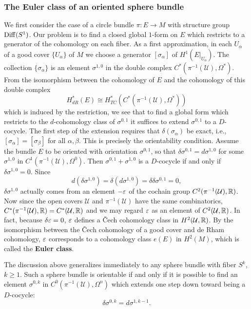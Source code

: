 \subsubsection{The Euler class of an oriented sphere bundle}
We first consider the case of a circle bundle $\pi:E\to M$ with structure group $\mathrm{Diff}(S^1)$. Our problem is to find a closed global $1$-form on $E$ which restricts to 
a generator of the cohomology on each fiber. As a first approximation, in each $U_\alpha$ of a good cover $\{U_\alpha\}$ of $M$ we choose a generator $[\sigma_\alpha]$ 
of $H^1(E|_{U_\alpha})$. The collection $\{\sigma_\alpha\}$ is an element $\sigma^{1,0}$ in the double complex $C^*(\pi^{-1}(\mathcal{U}),\Omega^*)$. From the 
isomorphism between the cohomology of $E$ and the cohomology of this double complex
\[H^*_{dR}(E)\cong H_{TC}^*(C^*(\pi^{-1}(\mathcal{U}),\Omega^*))\]
which is induced by the restriction, we see that to find a global form which restricts to the $d$-cohomology class of $\sigma^{0,1}$ it suffices to extend 
$\sigma^{0,1}$ to a $D$-cocycle. The first step of the extension requires that $\delta(\sigma_\alpha)$ be exact, i.e., $[\sigma_\alpha]=[\sigma_\beta]$ for all 
$\alpha,\beta$. This is precisely the orientability condition. Assume the bundle $E$ to be oriented with orientation $\sigma^{0,1}$, so that $\delta\sigma^{0,1}=d\sigma^{1,0}$ 
for some $\sigma^{1,0}$ in $C^1(\pi^{-1}(\mathcal{U}),\Omega^0)$. Then $\sigma^{0,1}+\sigma^{1,0}$ is a $D$-cocycle if and only if $\delta\sigma^{1,0}=0$. Since
\[d(\delta\sigma^{1,0})=\delta(d\sigma^{1,0})=\delta\delta\sigma^{0,1}=0,\]
$\delta\sigma^{1,0}$ actually comes from an element $-\varepsilon$ of the cochain group $C^2(\pi^{-1}(\mathcal{U}),\mathbb{R})$. Now since the open covers $\mathcal{U}$ and $\pi^{-1}(\mathcal{U})$ 
have the same combinatorics, $C^*(\pi^{-1}(\mathcal{U}),\mathbb{R})=C^*(\mathcal{U},\mathbb{R})$ and we may regard $\varepsilon$ as an element of $C^2(\mathcal{U},\mathbb{R})$. In fact, because 
$\delta\varepsilon=0$, $\varepsilon$ defines a \v{C}ech cohomology class in $H^2(\mathcal{U},\mathbb{R})$. By the isomorphism between the \v{C}ech cohomology of a good cover and de Rham 
cohomology, $\varepsilon$ corresponds to a cohomology class $e(E)$ in $H^2(M)$, which is called the \textbf{Euler class}.\par
The discussion above generalizes immediately to any sphere bundle with fiber $S^k$, $k\geq 1$. Such a sphere bundle is orientable if and only if it is possible to find 
an element $\sigma^{0,k}$ in $C^0(\pi^{-1}(\mathcal{U}),\Omega^n)$ which extends one step down toward being a $D$-cocycle:
\[\delta\sigma^{0,k}=d\sigma^{1,k-1}.\]
